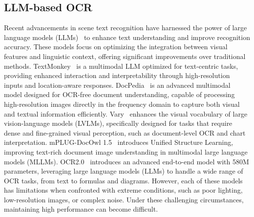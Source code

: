 \subsection{LLM-based OCR} 
Recent advancements in scene text recognition have harnessed the power of large language models (LLMs)~\cite{zhao2023survey} to enhance text understanding and improve recognition accuracy. These models focus on optimizing the integration between visual features and linguistic context, offering significant improvements over traditional methods. TextMonkey~\cite{liu2024textmonkey} is a multimodal LLM optimized for text-centric tasks, providing enhanced interaction and interpretability through high-resolution inputs and location-aware responses. 
DocPedia~\cite{feng2023docpedia} is an advanced multimodal model designed for OCR-free document understanding, capable of processing high-resolution images directly in the frequency domain to capture both visual and textual information efficiently. 
Vary~\cite{wei2025vary} enhances the visual vocabulary of large vision-language models (LVLMs), specifically designed for tasks that require dense and fine-grained visual perception, such as document-level OCR and chart interpretation. 
mPLUG-DocOwl 1.5~\cite{hu2024mplug} introduces Unified Structure Learning, improving text-rich document image understanding in multimodal large language models (MLLMs). 
OCR2.0~\cite{wei2024OCR2.0} introduces an advanced end-to-end model with 580M parameters, leveraging large language models (LLMs) to handle a wide range of OCR tasks, from text to formulas and diagrams. 
However, each of these models has limitations when confronted with extreme conditions, such as poor lighting, low-resolution images, or complex noise. Under these challenging circumstances, maintaining high performance can become difficult.






